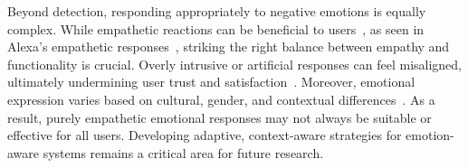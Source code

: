 Beyond detection, responding appropriately to negative emotions is equally complex. While empathetic reactions can be beneficial to users~\cite{raamkumar2022empathetic,hu2022acoustically}, as seen in Alexa's empathetic responses~\cite{carolus2021alexa}, striking the right balance between empathy and functionality is crucial. Overly intrusive or artificial responses can feel misaligned, ultimately undermining user trust and satisfaction~\cite{atta2024influence,berking2012emotion}. Moreover, emotional expression varies based on cultural, gender, and contextual differences~\cite{fischer2004gender,fischer2000relation}. As a result, purely empathetic emotional responses may not always be suitable or effective for all users. Developing adaptive, context-aware strategies for emotion-aware systems remains a critical area for future research.



